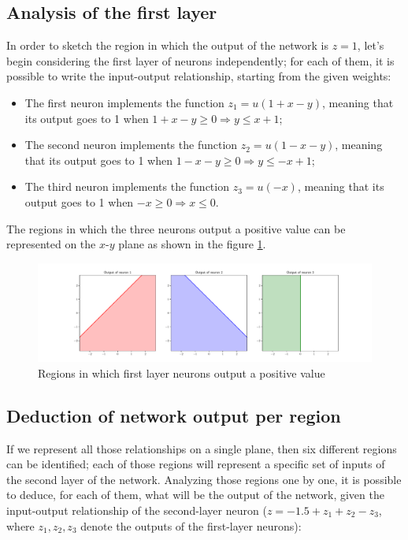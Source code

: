 \documentclass[letterpaper,headings=standardclasses]{scrartcl}
\begin{document}
\subsection{Analysis of the first layer}

In order to sketch the region in which the output of the network is $z = 1$, let's begin considering the first layer of neurons independently; for each of them, it is possible to write the input-output relationship, starting from the given weights:

\begin{itemize}

\item The first neuron implements the function $z_1 = u(1 + x - y)$, meaning that its output goes to 1 when $1 + x - y \ge 0 \Rightarrow y \le x + 1$;
\item The second neuron implements the function $z_2 = u(1 - x - y)$, meaning that its output goes to 1 when $1 - x - y \ge 0 \Rightarrow y \le -x + 1$;
\item The third neuron implements the function $z_3 = u(-x)$, meaning that its output goes to 1 when $-x \ge 0 \Rightarrow x \le 0$.

\end{itemize}

The regions in which the three neurons output a positive value can be represented on the $x$-$y$ plane as shown in the figure \ref{first_layer_out_sep}.

\begin{figure}[h]
\centering
\includegraphics[width=\linewidth]{first_layer_out_sep.pdf}
\caption{Regions in which first layer neurons output a positive value}
\label{first_layer_out_sep}
\end{figure}

\subsection{Deduction of network output per region}

If we represent all those relationships on a single plane, then six different regions can be identified; each of those regions will represent a specific set of inputs of the second layer of the network. Analyzing those regions one by one, it is possible to deduce, for each of them, what will be the output of the network, given the input-output relationship of the second-layer neuron ($z = -1.5 + z_1 + z_2 - z_3$, where $z_1, z_2, z_3$ denote the outputs of the first-layer neurons):
\end{document}
